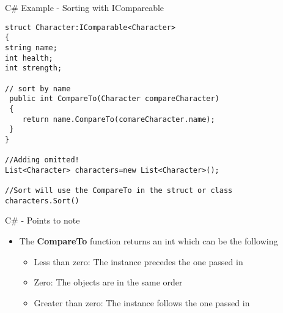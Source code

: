 \begin{frame}[fragile]{C\# Example - Sorting with ICompareable }
\begin{lstlisting}
struct Character:IComparable<Character>
{
string name;
int health;
int strength;

// sort by name
 public int CompareTo(Character compareCharacter)
 {
 	return name.CompareTo(comareCharacter.name);
 }
}

//Adding omitted!
List<Character> characters=new List<Character>();

//Sort will use the CompareTo in the struct or class
characters.Sort()
\end{lstlisting}
\end{frame}

\begin{frame}{C\# - Points to note}
	\begin{itemize}
		\pause \item The \textbf{CompareTo} function returns an int which can be the following
		\begin{itemize}
			\pause \item Less than zero: The instance precedes the one passed in
			\pause \item Zero: The objects are in the same order
			\pause \item Greater than zero: The instance follows the one passed in
		\end{itemize} 
	\end{itemize}
\end{frame}
